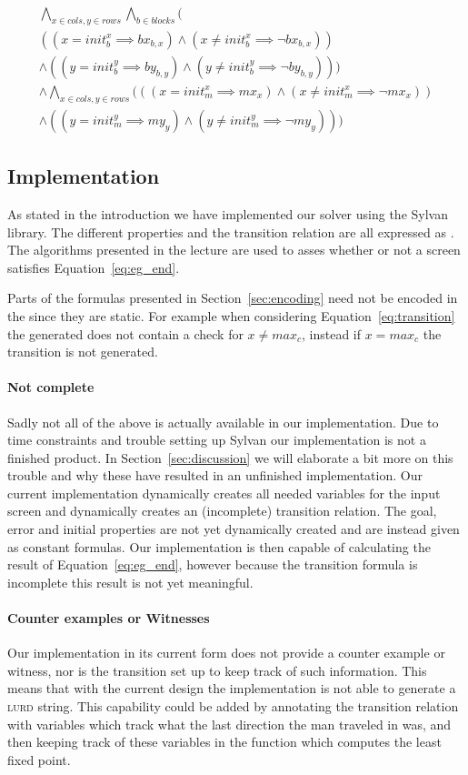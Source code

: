 \begin{multline} \label{eq:propInitial}
	\bigwedge_{x \in cols, y \in rows} \bigwedge_{b \in blocks} \bigg(\\  
		((x = init_b^x \implies bx_{b,x}) 
			\wedge (x \neq init_b^x \implies \neg bx_{b,x})) \\  
		\wedge ((y = init_b^y \implies by_{b,y}) 
			\wedge (y \neq init_b^y \implies \neg by_{b,y})) \bigg)\\  
	\wedge \bigwedge_{x \in cols, y \in rows} \Big(
		((x = init_m^x \implies mx_x) 
			\wedge (x \neq init_m^x \implies \neg mx_x)) \\  
		\wedge ((y = init_m^y \implies my_y) 
			\wedge (y \neq init_m^y \implies \neg my_y))
	\Big)
\end{multline}

\subsection{Implementation}
As stated in the introduction we have implemented our solver using the Sylvan
\robdd library. The different properties and the transition relation are all
expressed as \robdds. The algorithms presented in the lecture are used to 
asses whether or not a screen satisfies Equation~\ref{eq:eg_end}.

Parts of the formulas presented in Section~\ref{sec:encoding} need not be 
encoded in the \robdd since they are static. For example when considering
Equation~\ref{eq:transition} the generated \robdd does not contain a check for 
$x \neq max_c$, instead if $x = max_c$ the transition is not generated. 

\paragraph{Not complete} Sadly not all of the above is actually available in our
implementation. Due to time constraints and trouble setting up Sylvan our 
implementation is not a finished product. In Section~\ref{sec:discussion} we
will elaborate a bit more on this trouble and why these have resulted in an
unfinished implementation. Our current implementation dynamically creates all
needed variables for the input screen and dynamically creates an (incomplete)
transition relation. The goal, error and initial properties are not yet 
dynamically created and are instead given as constant formulas. Our 
implementation is then capable of calculating the result of 
Equation~\ref{eq:eg_end}, however because the transition formula is incomplete 
this result is not yet meaningful. 

\paragraph{Counter examples or Witnesses} Our implementation in its current form 
does not provide a counter example or witness, nor is the transition set up to
keep track of such information. This means that with the current design the 
implementation is not able to generate a \textsc{lurd} string. This capability
could be added by annotating the transition relation with variables which track
what the last direction the man traveled in was, and then keeping track of these
variables in the function which computes the least fixed point.
